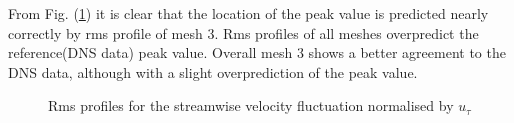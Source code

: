 From Fig. (\ref{urms wale}) it is clear that the location of the peak value is predicted nearly correctly by rms profile of mesh 3. Rms profiles of all meshes overpredict the reference(DNS data) peak value. Overall mesh 3 shows a better agreement to the DNS data, although with a slight overprediction of the peak value. 
%
\begin{figure}[h!]
\begin{minipage}[b]{0.5\textwidth}
\end{minipage}
%
\begin{minipage}[b]{0.5\textwidth}
\end{minipage}
\caption{Rms profiles for the streamwise velocity fluctuation normalised by $u_\tau$}
\label{urms wale}
\end{figure}

